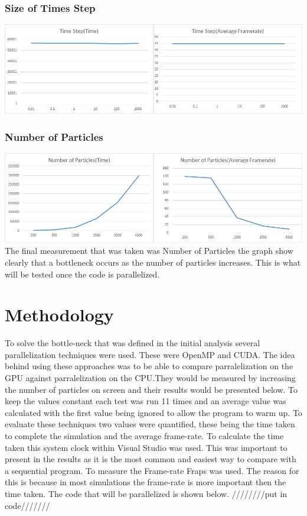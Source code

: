 \documentclass[12pt]{article}
\begin{document}
\subsubsection{Size of Times Step}
\includegraphics[scale=0.5]{pics/iatime.png}
\newline

\subsubsection{ Number of Particles}
\includegraphics[scale=0.5]{pics/ianumber.png}
\newline
The final measurement that was taken was Number of Particles the graph show clearly that a bottleneck occurs as the number of particles increases. This is what will be tested once the code is parallelized. 
	
\section{Methodology}
To solve the bottle-neck that was defined in the initial analysis several parallelization techniques were used. These were OpenMP and CUDA. The idea behind using these approaches was to be able to compare parralelization on the GPU against  parralelization on the CPU.They would be measured by increasing the number of particles on screen and their results would be presented below.
\newline
To keep the values constant each test was run 11 times and an average value was calculated with the first value being ignored to allow the program to warm up. To evaluate these techniques two values were quantified, these being the time taken to complete the simulation and the average frame-rate. To calculate the time taken this system clock within Visual Studio was used. This was important to present in the results as it is the most common and easiest way to compare with a sequential program. To measure the Frame-rate Fraps was used. The reason for this is because in most simulations the frame-rate is more important then the time taken. 
\newline
The code that will be parallelized is shown below.
////////put in code/////// 
\end{document}
